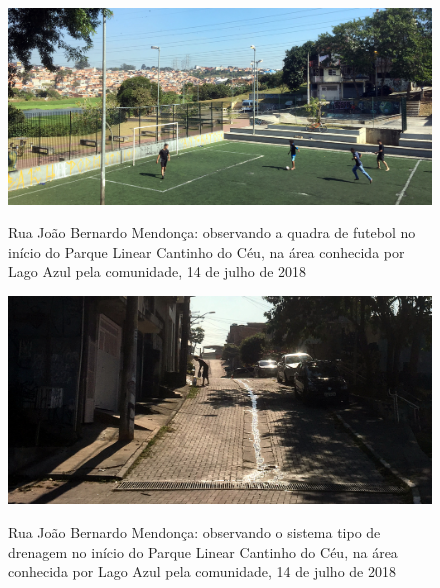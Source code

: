 	\begin{figure}[htb]
		\centering
		\caption[Quadra de futebol em 14/07/2018]{Rua João Bernardo Mendonça: observando a quadra de futebol no início do Parque Linear Cantinho do Céu, na área conhecida por Lago Azul pela comunidade, 14 de julho de 2018}
		\includegraphics[width=\linewidth]{img/visita_futebol}
		\label{fig:futebol}
	\end{figure}

	\begin{figure}[htb]
		\centering
		\caption[Exemplo do sistema tipo de drenagem em 14/07/2018]{Rua João Bernardo Mendonça: observando o sistema tipo de drenagem no início do Parque Linear Cantinho do Céu, na área conhecida por Lago Azul pela comunidade, 14 de julho de 2018}
		\includegraphics[width=\linewidth]{img/visita_drenagem}
		\label{fig:drenagem}
	\end{figure}
	
